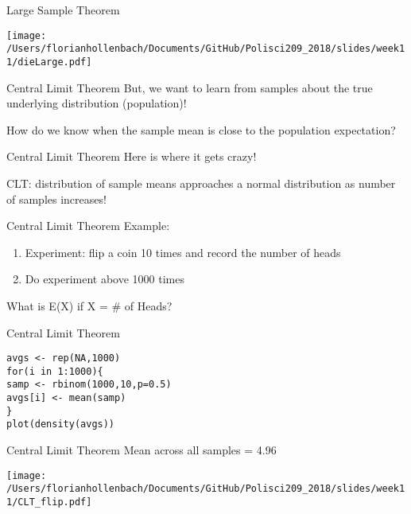 \documentclass[presentation]{beamer}
\begin{document}
\begin{frame}[label={sec:org03d0273}]{Large Sample Theorem}
\begin{center}
\texttt{[image: /Users/florianhollenbach/Documents/GitHub/Polisci209\_2018/slides/week11/dieLarge.pdf]}
\end{center}
\end{frame}


\begin{frame}[label={sec:orga0b64c8}]{Central Limit Theorem}
\alert{But}, we want to learn from samples about the true underlying distribution (population)!

How do we know when the sample mean is close to the population expectation?
\end{frame}

\begin{frame}[label={sec:orgbcd39fa}]{Central Limit Theorem}
\alert{Here is where it gets crazy!}

CLT: distribution of sample means approaches a normal distribution as number of samples increases!
\end{frame}



\begin{frame}[label={sec:org6aa2799}]{Central Limit Theorem}
Example:
\begin{enumerate}
\item Experiment: flip a coin 10 times and record the number of heads
\item Do experiment above 1000 times
\end{enumerate}

What is E(X) if X = \# of Heads?
\end{frame}


\begin{frame}[fragile,label={sec:org688d0dc}]{Central Limit Theorem}
 \begin{verbatim}
avgs <- rep(NA,1000)
for(i in 1:1000){
samp <- rbinom(1000,10,p=0.5)
avgs[i] <- mean(samp)
}
plot(density(avgs))
\end{verbatim}
\end{frame}


\begin{frame}[label={sec:org068ef37}]{Central Limit Theorem}
Mean across all samples = 4.96

\begin{center}
\texttt{[image: /Users/florianhollenbach/Documents/GitHub/Polisci209\_2018/slides/week11/CLT\_flip.pdf]}
\end{center}
\end{frame}
\end{document}
